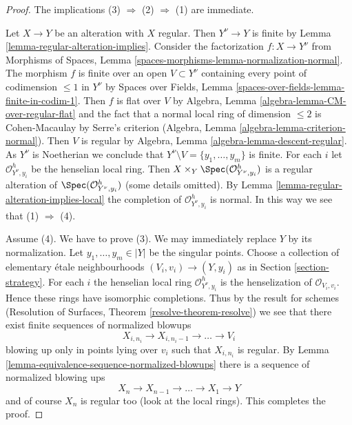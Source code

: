 \begin{proof}
The implications (3) $\Rightarrow$ (2) $\Rightarrow$ (1) are immediate.

\medskip\noindent
Let $X \to Y$ be an alteration with $X$ regular. Then $Y^\nu \to Y$
is finite by Lemma \ref{lemma-regular-alteration-implies}.
Consider the factorization $f : X \to Y^\nu$ from 
Morphisms of Spaces, Lemma \ref{spaces-morphisms-lemma-normalization-normal}.
The morphism $f$ is finite over an open $V \subset Y^\nu$ containing
every point of codimension $\leq 1$ in $Y^\nu$
by Spaces over Fields, Lemma \ref{spaces-over-fields-lemma-finite-in-codim-1}.
Then $f$ is flat over $V$ by
Algebra, Lemma \ref{algebra-lemma-CM-over-regular-flat}
and the fact that a normal local ring
of dimension $\leq 2$ is Cohen-Macaulay by Serre's criterion
(Algebra, Lemma \ref{algebra-lemma-criterion-normal}).
Then $V$ is regular by Algebra, Lemma \ref{algebra-lemma-descent-regular}.
As $Y^\nu$ is Noetherian we conclude that
$Y^\nu \setminus V = \{y_1, \ldots, y_m\}$ is finite.
For each $i$ let $\mathcal{O}_{Y^\nu, y_i}^h$ be the henselian
local ring. Then $X \times_Y \Spec(\mathcal{O}_{Y^\nu, y_i}^h)$
is a regular alteration of $\Spec(\mathcal{O}_{Y^\nu, y_i}^h)$
(some details omitted).
By Lemma \ref{lemma-regular-alteration-implies-local}
the completion of $\mathcal{O}_{Y^\nu, y_i}^h$ is normal.
In this way we see that (1) $\Rightarrow$ (4).

\medskip\noindent
Assume (4). We have to prove (3). We may immediately replace
$Y$ by its normalization. Let $y_1, \ldots, y_m \in |Y|$ be the
singular points. Choose a collection of elementary \'etale neighbourhoods
$(V_i, v_i) \to (Y, y_i)$ as in Section \ref{section-strategy}.
For each $i$ the henselian local ring $\mathcal{O}_{Y^\nu, y_i}^h$
is the henselization of $\mathcal{O}_{V_i, v_i}$.
Hence these rings have isomorphic completions.
Thus by the result for schemes
(Resolution of Surfaces, Theorem \ref{resolve-theorem-resolve})
we see that there exist finite sequences of normalized blowups
$$
X_{i, n_i} \to X_{i, n_i - 1} \to \ldots \to V_i
$$
blowing up only in points lying over $v_i$ such that $X_{i, n_i}$
is regular. By Lemma \ref{lemma-equivalence-sequence-normalized-blowups}
there is a sequence of normalized blowing ups
$$
X_n \to X_{n - 1} \to \ldots \to X_1 \to Y
$$
and of course $X_n$ is regular too (look at the local rings).
This completes the proof.
\end{proof}















